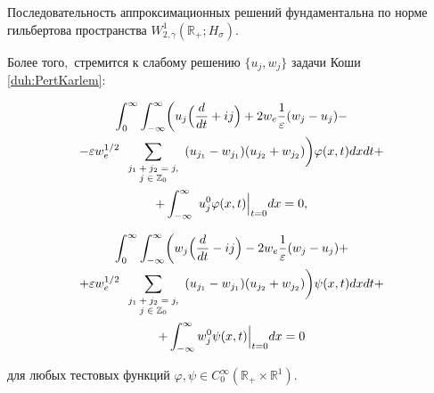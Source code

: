\hypertarget{dukh:th:12}{}



\begin{theorem}[12]Последовательность аппроксимационных решений фундаментальна по норме гильбертова пространства $W^1_{2,\gamma}(\mathbb R_{+}; H_{\sigma}).$ 

Более того$,$ стремится к слабому решению $\{u_j, w_j\}$ задачи Коши \eqref{duh:PertKarlem}{\rm\/:}

\begin{multline*}

\int_0^\infty \int_{-\infty}^\infty

\biggl(u_j \Bigl(\frac{d}{dt}+ij\Bigr)+2w_e\frac{1}{\ve}(w_j-u_j)-

\\

-\ve w_e^{1/2}\sum_{

\scriptsize

\begin{array}{c}

 j_1+j_2=j, \\

 j\in \mathbb Z_0

\end{array}

}(u_{j_1}-w_{j_1})(u_{j_2}+w_{j_2})\biggr) \varphi(x,t)

dxdt+

\\

+

\int_{-\infty}^\infty~u_j^0 \varphi(x,t)\Bigr|_{t=0} dx=0,

\end{multline*}

\begin{multline*}

\int_0^\infty \int_{-\infty}^\infty 

\biggl(w_j \Bigl(\frac{d}{dt}-ij\Bigr)-2w_e\frac{1}{\ve}(w_j-u_j)+

\\

+\ve w_e^{1/2}\sum_{

\scriptsize

\begin{array}{c}

 j_1+j_2=j, \\ 

 j\in \mathbb Z_0

\end{array}

}(u_{j_1}-w_{j_1})(u_{j_2}+w_{j_2})\biggr) 

\psi(x,t) dxdt+ \\+ \int_{-\infty}^\infty w_j^0 \psi(x,t)\Bigr|_{t=0} dx=0

\end{multline*}

для любых тестовых функций $\varphi, \psi\in C^\infty_0(\mathbb R_{+}\times \mathbb R^1).$

\end{theorem}



